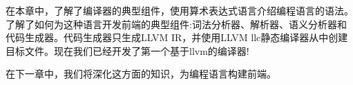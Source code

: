 在本章中，了解了编译器的典型组件，使用算术表达式语言介绍编程语言的语法。了解了如何为这种语言开发前端的典型组件:词法分析器、解析器、语义分析器和代码生成器。代码生成器只生成LLVM IR，并使用LLVM llc静态编译器从中创建目标文件。现在我们已经开发了第一个基于llvm的编译器!

在下一章中，我们将深化这方面的知识，为编程语言构建前端。
